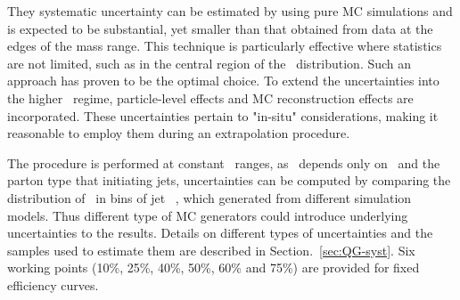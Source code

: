 They systematic uncertainty can be estimated by using pure MC simulations and is expected to be substantial, yet smaller than that obtained from data at the edges of the mass range. This technique is particularly effective where statistics are not limited, such as in the central region of the \pt\ distribution. Such an approach has proven to be the optimal choice. To extend the uncertainties into the higher \pt\ regime, particle-level effects and MC reconstruction effects are incorporated. These uncertainties pertain to "in-situ" considerations, making it reasonable to employ them during an extrapolation procedure.

The procedure is performed at constant \pt\ ranges, as \ntrk~depends only on \pt\ and the parton type that initiating jets, uncertainties can be computed by comparing the distribution of \ntrk~in bins of jet \pt~, which generated from different simulation models. Thus different type of MC generators could introduce underlying uncertainties to the results. Details on different types of uncertainties and the samples used to estimate them are described in Section.~\ref{sec:QG-syst}. Six working points (10\%, 25\%, 40\%, 50\%, 60\% and 75\%) are provided for fixed efficiency curves.


%
%
%
